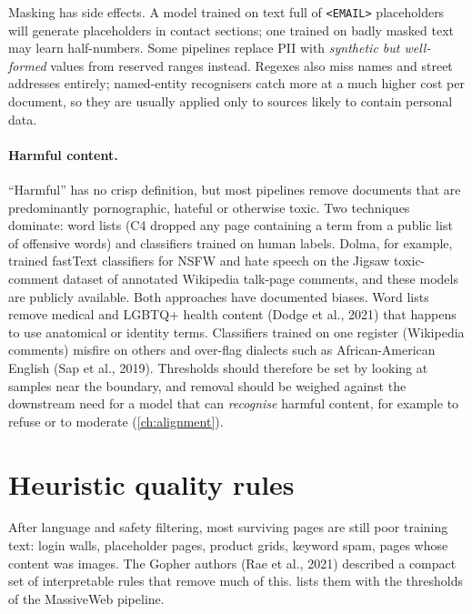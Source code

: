 Masking has side effects. A model trained on text full of \texttt{<EMAIL>} placeholders will
generate placeholders in contact sections; one trained on badly masked text may learn half-numbers.
Some pipelines replace PII with \emph{synthetic but well-formed} values from reserved ranges
instead. Regexes also miss names and street addresses entirely; named-entity recognisers catch
more at a much higher cost per document, so they are usually applied only to sources likely to
contain personal data.

\paragraph{Harmful content.} ``Harmful'' has no crisp definition, but most pipelines remove
documents that are predominantly pornographic, hateful or otherwise toxic. Two techniques
dominate: word lists (C4 dropped any page containing a term from a public list of offensive
words) and classifiers trained on human labels. Dolma, for example, trained fastText
classifiers for NSFW and hate speech on the Jigsaw toxic-comment dataset of annotated Wikipedia
talk-page comments, and these models are publicly available. Both approaches have documented
biases. Word lists remove medical and LGBTQ+ health content (Dodge et al., 2021) that happens to use anatomical or
identity terms. Classifiers trained on one register (Wikipedia comments) misfire on others and
over-flag dialects such as African-American English (Sap et al., 2019). Thresholds should therefore be set by looking at
samples near the boundary, and removal should be weighed against the downstream need for a model
that can \emph{recognise} harmful content, for example to refuse or to moderate
(\cref{ch:alignment}).

\section{Heuristic quality rules}\label{sec:data:rules}

After language and safety filtering, most surviving pages are still poor training text: login
walls, placeholder pages, product grids, keyword spam, pages whose content was images. The
Gopher authors (Rae et al., 2021) described a compact set of interpretable rules that remove much
of this.  lists them with the thresholds of the MassiveWeb pipeline.

